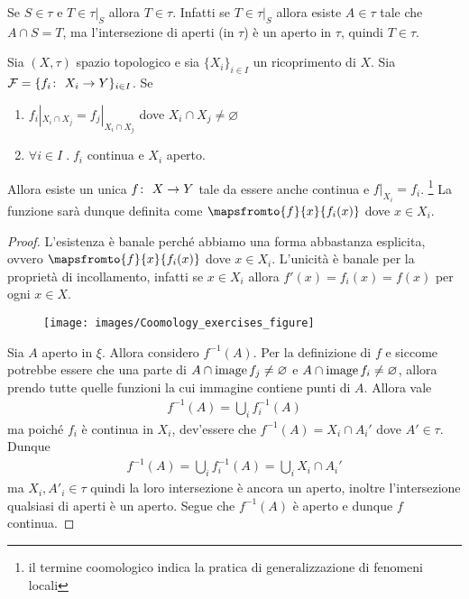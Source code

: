 \begin{remark}
	Se $S \in \tau$ e $T \in \tau|_S$ allora $T \in \tau$. Infatti se $T \in \tau|_S$ allora esiste $A \in \tau$ tale che $A \cap S = T$, ma l'intersezione di aperti (in $\tau$) è un aperto in $\tau$, quindi $T \in \tau$.
\end{remark}

\begin{theorem}
	Sia $(X,\tau)$ spazio topologico e sia $\{X_i\}_{i \in I}$ un ricoprimento di $X$. Sia $\mathcal{F} = \{ f_i \colon\ X_i \rightarrow Y\}_{i \in I}$. Se 
	\begin{enumerate}
		\item $f_i|_{X_i \cap X_j} = f_j|_{X_i \cap X_j}$ dove $X_i \cap X_j \neq \varnothing$
		\item $\forall i \in I \; . \; f_i$ continua e $X_i$ aperto.
	\end{enumerate}
	Allora esiste un unica $f \colon\ X \rightarrow Y$ tale da essere anche continua e $f|_{X_i} = f_i$. \footnote{il termine coomologico indica la pratica di generalizzazione di fenomeni locali}
	La funzione sarà dunque definita come $\mapsfromto{f}{x}{f_i(x)}$ dove $x \in X_i$.
\end{theorem}
\begin{proof}
	L'esistenza è banale perché abbiamo una forma abbastanza esplicita, ovvero $\mapsfromto{f}{x}{f_i(x)}$ dove $x \in X_i$. L'unicità è banale per la proprietà di incollamento, infatti se $x \in X_i$ allora $f'(x) = f_i(x) = f(x)$ per ogni $x \in X$.
	
	\begin{figure}[h!]
		\centering
		\texttt{[image: images/Coomology\_exercises\_figure]}
		\caption{}
		\label{fig:coomologyexercisesfigure}
	\end{figure}

	Sia $A$ aperto in $\xi$. Allora considero $f^{-1}(A)$. Per la definizione di $f$ e siccome potrebbe essere che una parte di $A \cap \operatorname{image}{f_j} \neq \varnothing$ e $A \cap \operatorname{image}{f_i} \neq \varnothing$, allora prendo tutte quelle funzioni la cui immagine contiene punti di $A$. Allora vale 
	\begin{equation}
	\begin{aligned}
		f^{-1}(A) = \bigcup_{i} f_i^{-1}(A) 
	\end{aligned}
	\end{equation}
	ma poiché $f_i$ è continua in $X_i$, dev'essere che $f^{-1}(A) = X_i \cap A_i'$ dove $A' \in \tau$. Dunque 
	\begin{equation}
	\begin{aligned}
		f^{-1}(A) = \bigcup_{i} f_i^{-1}(A) = \bigcup_{i} X_i \cap A_i' 
	\end{aligned}
	\end{equation}
	ma $X_i, A'_i \in \tau$ quindi la loro intersezione è ancora un aperto, inoltre l'intersezione qualsiasi di aperti è un aperto. Segue che $f^{-1}(A)$ è aperto e dunque $f$ continua.
\end{proof}


